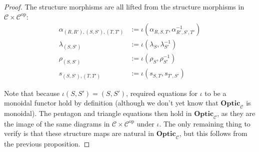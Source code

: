 \documentclass[11pt,letterpaper]{article}
\theoremstyle{plain}
\theoremstyle{definition}
\newcommand{\C}{\mathscr{C}}
\newcommand{\Optic}{\mathbf{Optic}}
\newcommand{\op}{\mathrm{op}}
\newcommand{\todo}[1]{\textcolor{red}{\small #1}}
\begin{document}
\begin{proof}

  The structure morphisms are all lifted from the structure morphisms in $\C \times \C^\op$:
  \begin{align*}
    \alpha_{(R, R'), (S, S'), (T, T')} &:= \iota(\alpha_{R,S,T}, \alpha_{R',S',T'}^{-1}) \\
    \lambda_{(S, S')} &:= \iota(\lambda_{S}, \lambda_{S'}^{-1}) \\
    \rho_{(S, S')} &:= \iota(\rho_{S}, \rho_{S'}^{-1}) \\
    s_{(S, S'), (T, T')} &:= \iota(s_{S, T}, s_{T', S'})
  \end{align*}

  Note that because $\iota(S, S') = (S, S')$, required equations for $\iota$ to be a monoidal functor hold by definition (although we don't yet know that $\Optic_\C$ is monoidal). The pentagon and triangle equations then hold in $\Optic_\C$, as they are the image of the same diagrams in $\C \times \C^\op$ under $\iota$. The only remaining thing to verify is that these structure maps are natural in $\Optic_\C$, but this follows from the previous proposition.


\end{proof}
\end{document}

